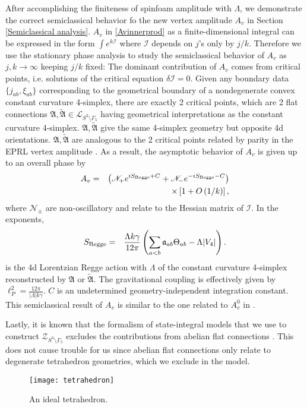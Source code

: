 \documentclass[aps,prd,notitlepage,nofootinbib,superscriptaddress,groupedaddress,twocolumn]{revtex4-1}
\def\be{\begin{eqnarray}}
\def\ee{\end{eqnarray}}
\newcommand{\ci}{\mathcal I}
\newcommand{\cl}{\mathcal L}
\newcommand{\cz}{\mathcal Z}
\newcommand{\fa}{\mathfrak{a}}  \newcommand{\Fa}{\mathfrak{A}}
\newcommand{\g}{\gamma}
\newcommand{\G}{\Gamma}
\renewcommand{\L }{\Lambda}
\newcommand{\lt}{\left}
\newcommand{\rt}{\right}
\newcommand{\sn}{\mathscr{N}}
\begin{document}
After accomplishing the finiteness of spinfoam amplitude with $\L$, we demonstrate the correct semiclassical behavior fo the new vertex amplitude $A_v$ in Section \ref{Semiclassical analysis}. $A_v$ in \eqref{Avinnerprod} as a finite-dimensional integral can be expressed in the form $\int e^{k \ci}$ where $\ci$ depends on $j$'s only by $j/k$. Therefore we use the stationary phase analysis to study the semiclassical behavior of $A_v$ as $j,k\to\infty$ keeping $j/k$ fixed: The dominant contribution of $A_v$ comes from critical points, i.e. solutions of the critical equation $\delta \ci=0$. Given any boundary data $\{j_{ab},\xi_{ab}\}$ corresponding to the geometrical boundary of a nondegenerate convex constant curvature 4-simplex, there are exactly 2 critical points, which are 2 flat connections $\Fa,\widetilde{\Fa}\in\cl_{S^3\setminus\G_5}$ having geometrical interpretations as the constant curvature 4-simplex. $\Fa,\widetilde{\Fa}$ give the same 4-simplex geometry but opposite 4d orientations. $\Fa,\widetilde{\Fa}$ are analogous to the 2 critical points related by parity in the EPRL vertex amplitude \cite{semiclassical}. As a result, the asymptotic behavior of $A_v$ is given up to an overall phase by
\be
A_v&=&\lt(\sn_{+}e^{iS_{\rm Regge}+C}+\sn_{-}e^{-iS_{\rm Regge}-C}\rt)\label{asympformula}\\
&&\times \lt[1+O\lt({1}/{k}\rt)\rt],\nonumber
\ee
where $\sn_{\pm}$ are non-oscillatory and relate to the Hessian matrix of $\ci$. In the exponents, 
\be
S_{\rm Regge}&=&\frac{\L k\g}{12\pi}\lt(\sum_{a<b}\fa_{ab}\Theta_{ab}-\L |V_4|\rt).
\ee
is the 4d Lorentzian Regge action with $\L$ of the constant curvature 4-simplex reconstructed by $\Fa$ or $\widetilde{\Fa}$. The gravitational coupling is effectively given by $\ell^2_P=\frac{12\pi}{|\L| k\g}$. $C$ is an undetermined geometry-independent integration constant. %
This semiclassical result of $A_v$ is similar to the one related to $A_v^0$ in \cite{HHKR,HHKRshort,3dblockHHKR}.

Lastly, it is known that the formalism of state-integral models that we use to construct $\cz_{S^3\setminus\G_5}$ excludes the contributions from abelian flat connections \cite{Dimofte2011,levelk,33revisit}. This does not cause trouble for us since abelian flat connections only relate to degenerate tetrahedron geometries, which we exclude in the model.


\begin{figure}[t]
	\begin{center}
	\texttt{[image: tetrahedron]}
	\caption{An ideal tetrahedron.}
	\label{tetrahedron}
	\end{center}
\end{figure}
\end{document}
